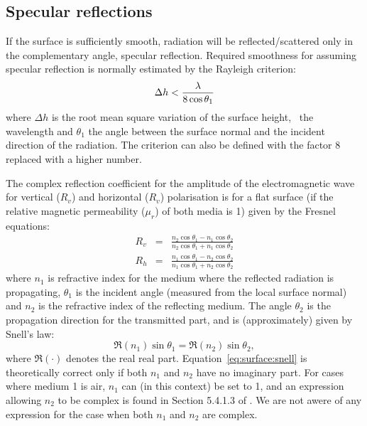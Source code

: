 \subsection{Specular reflections}
 
 If the surface is sufficiently smooth, radiation will be
 reflected/scattered only in the complementary angle, specular
 reflection. Required smoothness for assuming specular reflection is
 normally estimated by the Rayleigh criterion:
 \begin{equation}
   \label{eq:surface:rayleigh}
   \Delta h < \frac{\lambda}{8\cos\theta_1}
 \end{equation}
 where $\Delta h$ is the root mean square variation of the surface
 height, \Wvl\ the wavelength and $\theta_1$ the angle between the
 surface normal and the incident direction of the radiation. The
 criterion can also be defined with the factor 8 replaced with a 
 higher number.
 
 The complex reflection coefficient for the amplitude of the
 electromagnetic wave for vertical ($R_v$) and horizontal ($R_v$)
 polarisation is for a flat surface (if the relative magnetic
 permeability ($\mu_r$) of both media is 1) given by the Fresnel equations:
 \begin{eqnarray}
   \label{eq:surface_fresnel}
   R_v &=& \frac{n_2\cos\theta_1-n_1\cos\theta_2}
                                           {n_2\cos\theta_1+n_1\cos\theta_2} \\
   R_h &=& \frac{n_1\cos\theta_1-n_2\cos\theta_2}
                                           {n_1\cos\theta_1+n_2\cos\theta_2} 
 \end{eqnarray}
 where $n_1$ is refractive index for the medium where the reflected radiation
 is propagating, $\theta_1$ is the incident angle (measured from the local
 surface normal) and $n_2$ is the refractive index of the reflecting medium.
 The angle $\theta_2$ is the propagation direction for the transmitted part,
 and is (approximately) given by Snell's law:
 \begin{equation}
   \label{eq:surface:snell}
   \Re(n_1)\sin\theta_1 = \Re(n_2)\sin\theta_2,
 \end{equation}
 where $\Re(\cdot)$ denotes the real real part. Equation~\ref{eq:surface:snell}
 is theoretically correct only if both $n_1$ and $n_2$ have no imaginary part. 
 For cases where medium 1 is air, $n_1$ can (in this context) be set to 1, and 
an expression allowing $n_2$ to be complex is found in Section 5.4.1.3 of
\citet{liou:02}. We are not awere of any expression for the case when both
$n_1$ and $n_2$ are complex.

